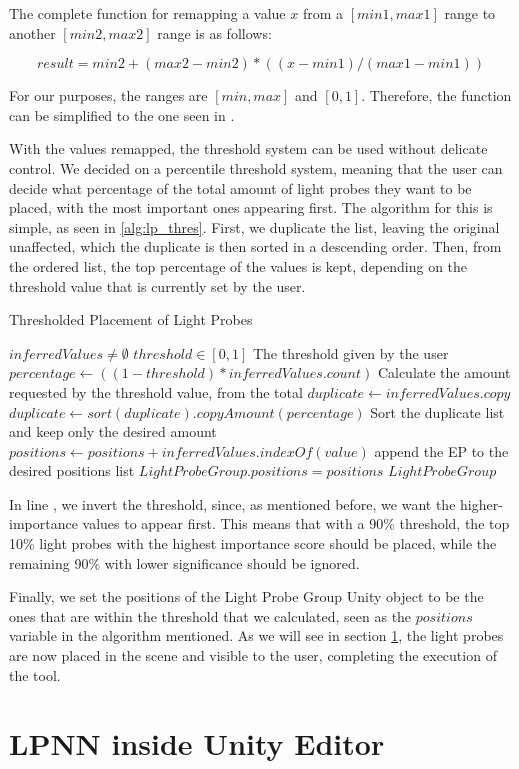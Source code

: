 The complete function for remapping a value $x$ from a \([min1, max1]\) range to another \([min2, max2]\) range is as follows:

\[ result = min2 + (max2 - min2) * ((x - min1)/(max1 - min1)) \]

For our purposes, the ranges are \([min, max]\) and \([0, 1]\). Therefore, the function can be simplified to the one seen in .

With the values remapped, the threshold system can be used without delicate control. We decided on a percentile threshold system, meaning that the user can decide what percentage of the total amount of light probes they want to be placed, with the most important ones appearing first. The algorithm for this is simple, as seen in \ref{alg:lp_thres}. First, we duplicate the list, leaving the original unaffected, which the duplicate is then sorted in a descending order. Then, from the ordered list, the top percentage of the values is kept, depending on the threshold value that is currently set by the user.

\begin{algorithm}
	\caption{Thresholded Placement of Light Probes}
	\label{alg:lp_thres}
	\begin{algorithmic}[1]
		\Require $inferredValues \neq \emptyset$
		\Require $threshold \in [0, 1]$
		\Comment The threshold given by the user
		\State $percentage \gets ((1-threshold) * inferredValues.count)$
		\Comment Calculate the amount requested by the threshold value, from the total
		\label{alg:lp_thres:1}
		\State $duplicate \gets inferredValues.copy$
		\State $duplicate \gets sort(duplicate).copyAmount(percentage)$
		\Comment Sort the duplicate list and keep only the desired amount
			\State $positions \gets positions + inferredValues.indexOf(value)$
			\Comment append the EP to the desired positions list
		\EndFor
		\State $LightProbeGroup.positions = positions$
		\State \Return $Light Probe Group$
	\end{algorithmic}
\end{algorithm}

In line , we invert the threshold, since, as mentioned before, we want the higher-importance values to appear first. This means that with a 90\% threshold, the top 10\% light probes with the highest importance score should be placed, while the remaining 90\% with lower significance should be ignored. 

Finally, we set the positions of the Light Probe Group Unity object to be the ones that are within the threshold that we calculated, seen as the $positions$ variable in the algorithm mentioned. As we will see in section \ref{sec:LPNN_UI}, the light probes are now placed in the scene and visible to the user, completing the execution of the tool.

\section{LPNN inside Unity Editor}
\label{sec:LPNN_UI}

